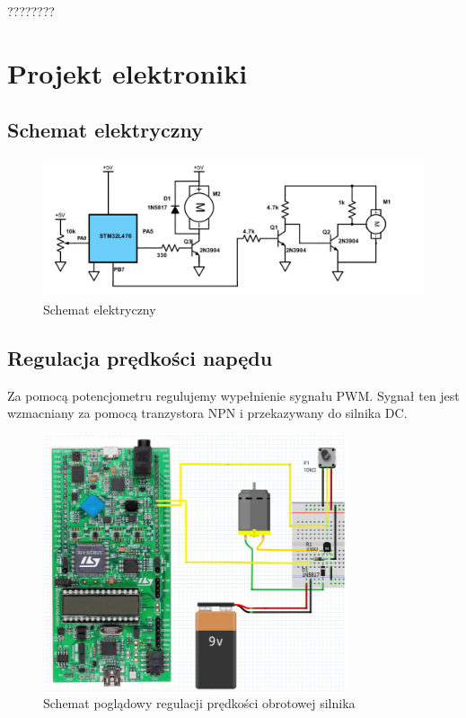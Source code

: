 \documentclass[10pt, a4paper]{article}
\begin{document}
????????

\section{Projekt elektroniki}
	\subsection{Schemat elektryczny}
	\begin{figure}[H]
		\centering
		\includegraphics[width=1\textwidth]{figures/schemeit-project.png}
		\caption{Schemat elektryczny}
		\label{fig:Schemat elektryczny}
	\end{figure}
	
\subsection{Regulacja prędkości napędu}
Za pomocą potencjometru regulujemy wypełnienie sygnału PWM. Sygnał ten jest wzmacniany za pomocą tranzystora NPN i przekazywany do silnika DC.

\begin{figure}[H]
	\centering
	\includegraphics[width=0.8\textwidth]{figures/pwm.png}
	\caption{Schemat poglądowy regulacji prędkości obrotowej silnika}
	\label{fig:KonfiguracjaPWM}
\end{figure}
\end{document}
